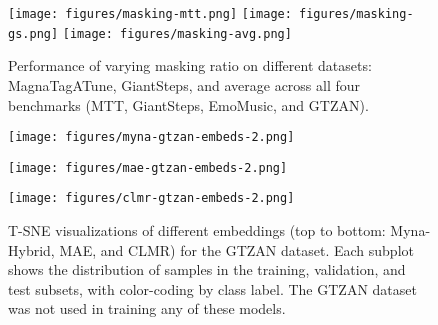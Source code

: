 \begin{figure*}[h!]
    \centering
    \texttt{[image: figures/masking-mtt.png]}
    \hfill
    \texttt{[image: figures/masking-gs.png]}
    \hfill
    \texttt{[image: figures/masking-avg.png]}
    \caption{Performance of varying masking ratio on different datasets: MagnaTagATune, GiantSteps, and average across all four benchmarks (MTT, GiantSteps, EmoMusic, and GTZAN).}
    \label{fig:masking-all}
\end{figure*}

\begin{figure*}[h!]
    \centering
    \texttt{[image: figures/myna-gtzan-embeds-2.png]}
    
    \texttt{[image: figures/mae-gtzan-embeds-2.png]}
    
    \texttt{[image: figures/clmr-gtzan-embeds-2.png]}

    \caption{T-SNE visualizations of different embeddings (top to bottom: Myna-Hybrid, MAE, and CLMR) for the GTZAN dataset. Each subplot shows the distribution of samples in the training, validation, and test subsets, with color-coding by class label. The GTZAN dataset was not used in training any of these models.}
    \label{fig:tsne-comparison}
\end{figure*}
